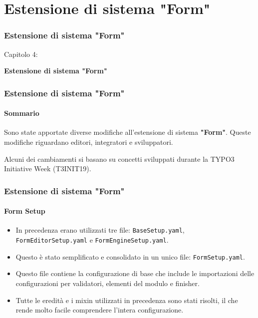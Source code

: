 %

\section{Estensione di sistema "Form"}
\begin{frame}[fragile]
	\frametitle{Estensione di sistema "Form"}

	\begin{center}\huge{Capitolo 4:}\end{center}
	\begin{center}\huge{\color{typo3darkgrey}\textbf{Estensione di sistema "Form"}}\end{center}

\end{frame}


\begin{frame}[fragile]
	\frametitle{Estensione di sistema "Form"}
	\framesubtitle{Sommario}

	\small
		Sono state apportate diverse modifiche all'estensione di sistema \textbf{"Form"}.
		Queste modifiche riguardano editori, integratori e sviluppatori.

		\vspace{0.2cm}

		Alcuni dei cambiamenti si basano su concetti sviluppati durante la TYPO3 Initiative Week (T3INIT19).

	\normalsize

\end{frame}


\begin{frame}[fragile]
	\frametitle{Estensione di sistema "Form"}
	\framesubtitle{Form Setup}

	\begin{itemize}
		\item In precedenza erano utilizzati tre file: \texttt{BaseSetup.yaml}, \texttt{FormEditorSetup.yaml} e \texttt{FormEngineSetup.yaml}.
		\item Questo è stato semplificato e consolidato in un unico file: \texttt{FormSetup.yaml}.
		\item Questo file contiene la configurazione di base che include le importazioni delle configurazioni per validatori, elementi del modulo e finisher.
		\item Tutte le eredità e i mixin utilizzati in precedenza sono stati risolti, il che rende molto facile comprendere l'intera configurazione.
	\end{itemize}

\end{frame}

